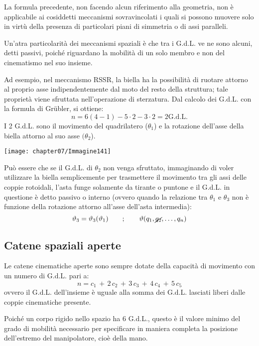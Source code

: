 La formula precedente, non facendo alcun riferimento alla geometria, non è applicabile ai cosiddetti meccanismi sovravincolati i quali si possono muovere solo in virtù della presenza di particolari piani di simmetria o di assi paralleli.

Un'atra particolarità dei meccanismi spaziali è che tra i G.d.L. ve ne sono alcuni, detti passivi, poiché riguardano la mobilità di un solo membro e non del cinematismo nel suo insieme.

\begin{minipage}{.5\textwidth}
Ad esempio, nel meccanismo RSSR, la biella ha la possibilità di ruotare attorno al proprio asse indipendentemente dal moto del resto della struttura; tale proprietà viene sfruttata nell'operazione di sterzatura. Dal calcolo dei G.d.L.  con la formula di Gr\"ubler, si ottiene:
\[n = 6(4-1) - 5 \cdot 2 - 3\cdot 2 = 2 \text{G.d.L.}\]
I 2 G.d.L. sono il movimento del quadrilatero ($\theta_1$) e la rotazione dell'asse della biella attorno al suo asse $(\theta_2$).
\end{minipage}
\hfill
\begin{minipage}{.45\textwidth}
\centering
\texttt{[image: chapter07/Immagine141]}
\end{minipage}

Può essere che se il G.d.L. di $\theta_2$ non venga sfruttato, immaginando di voler utilizzare la biella semplicemente per trasmettere il movimento tra gli assi delle coppie rotoidali, l'asta funge solamente da tirante o puntone e il G.d.L. in questione è detto passivo o interno (ovvero quando la relazione tra $\theta_1$ e $\theta_3$ non è funzione della rotazione attorno all'asse dell'asta intermedia):
\[\theta_3 = \theta_3(\theta_1)\qquad;\qquad \theta(q_1, \cancel{q_2}, \dots,q_n)\]

\subsection{Catene spaziali aperte}

Le catene cinematiche aperte sono sempre dotate della capacità di movimento con un numero di G.d.L. pari a:
\[n = c_1\,+\,2\,c_2\,+\,3\,c_3\,+\,4\,c_4\,+\,5\,c_5\]
ovvero il G.d.L. dell'insieme è uguale alla somma dei G.d.L. lasciati liberi dalle coppie cinematiche presente.

Poiché un corpo rigido nello spazio ha 6 G.d.L., questo è il valore minimo del grado di mobilità necessario per specificare in maniera completa la posizione dell'estremo del manipolatore, cioè della mano.

